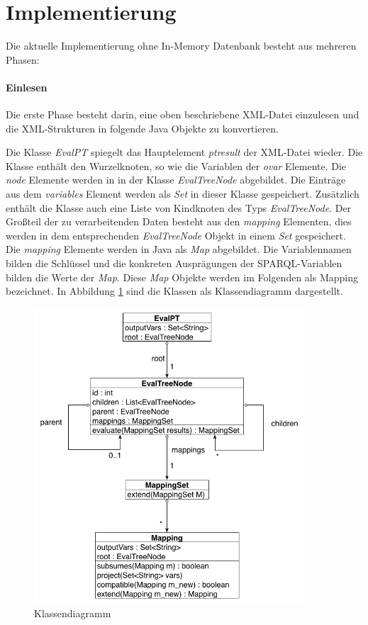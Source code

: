 \documentclass[draft,final]{vutinfth} %
\begin{document}
\section{Implementierung} \label{istImp}

Die aktuelle Implementierung ohne In-Memory Datenbank besteht aus mehreren Phasen:

\paragraph{Einlesen}
Die erste Phase besteht darin, eine oben beschriebene XML-Datei einzulesen und die XML-Strukturen in folgende Java Objekte zu konvertieren.

Die Klasse \textit{EvalPT} spiegelt das Hauptelement \textit{ptresult} der XML-Datei wieder. Die Klasse enthält den Wurzelknoten, so wie die Variablen der \textit{ovar} Elemente. Die \textit{node} Elemente werden in in der Klasse \textit{EvalTreeNode} abgebildet. Die Einträge aus dem \textit{variables} Element werden als \textit{Set} in dieser Klasse gespeichert. Zusätzlich enthält die Klasse auch eine Liste von Kindknoten des Typs \textit{EvalTreeNode}. Der Gro\ss teil der zu verarbeitenden Daten besteht aus den \textit{mapping} Elementen, dies werden in dem entsprechenden \textit{EvalTreeNode} Objekt in einem \textit{Set} gespeichert. Die \textit{mapping} Elemente werden in Java als \textit{Map} abgebildet. Die Variablennamen bilden die Schlüssel und die konkreten Ausprägungen der SPARQL-Variablen bilden die Werte der \textit{Map}. Diese \textit{Map} Objekte werden im Folgenden als Mapping bezeichnet. In Abbildung \ref{klassendiagramm} sind die Klassen als Klassendiagramm dargestellt. 

\begin{figure}[ht]
	\centering
	\includegraphics[width=0.9\textwidth]{Klassendiagramm}
	\caption{Klassendiagramm}
	\label{klassendiagramm}
\end{figure}
\end{document}
